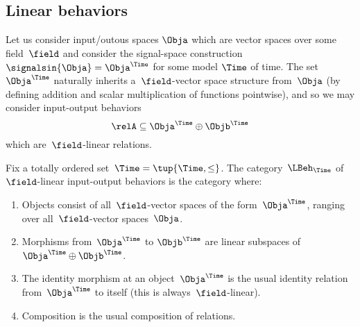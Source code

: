 


\subsection{Linear behaviors}

    Let us consider input/outous spaces $\Obja$ which are vector spaces over some field~$\field$ and consider the signal-space construction $\signalsin{\Obja} = \Obja^\Time$ for some model $\Time$ of time. The set $\Obja^\Time$ naturally inherits a~$\field$-vector space structure from~$\Obja$ (by defining addition and scalar multiplication of functions pointwise), and so we may consider input-output behaviors
    \begin{equation*}
        \relA \subseteq \Obja^\Time \oplus \Objb^\Time
    \end{equation*}
    which are~$\field$-linear relations.

    \begin{definition}
        Fix a totally ordered set~$\Time = \tup{\Time, \leq}$.
        The category~$\LBeh_\Time$ of~$\field$-linear input-output behaviors is the category where:
        \begin{enumerate}
            \item Objects consist of all~$\field$-vector spaces of the form~$\Obja^\Time$, ranging over all~$\field$-vector spaces~$\Obja$.
            \item Morphisms from~$\Obja^\Time$ to $\Objb^\Time$ are linear subspaces of~$\Obja^\Time \oplus \Objb^\Time$.
            \item The identity morphism at an object~$\Obja^\Time$ is the usual identity relation from~$\Obja^\Time$ to itself (this is always~$\field$-linear).
            \item Composition is the usual composition of relations.
        \end{enumerate}
    \end{definition}
    

